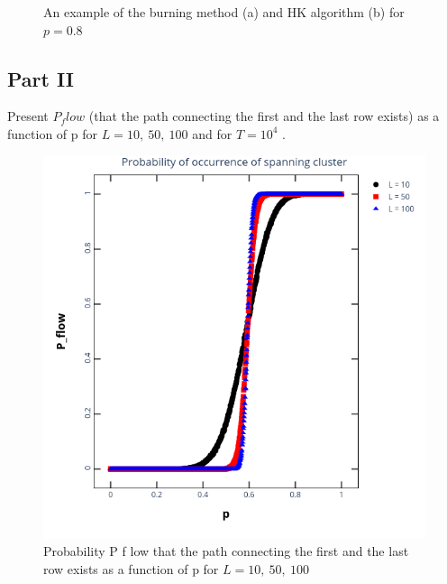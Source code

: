 \documentclass[11pt]{article}
\begin{document}
    \begin{figure}[H]
        \centering
        \caption{An example of the burning method (a) and HK algorithm (b) for $p = 0.8$}
        \label{fig:third}
    \end{figure}

    \subsection{Part II}
    \label{subsec:part-b}
    Present $P_flow$ (that the path connecting the first and the last row exists) as a function of
    p for $L = 10,\ 50,\ 100$ and for $T = 10^4$ .

    \begin{figure}[H]
        \centering
        \includegraphics[width=0.60\linewidth]{Pflow}
        \caption{Probability P f low that the path connecting the first and the last row
        exists as a function of p for $L = 10,\ 50,\ 100$}
        \label{fig:fourth}
    \end{figure}
\end{document}
